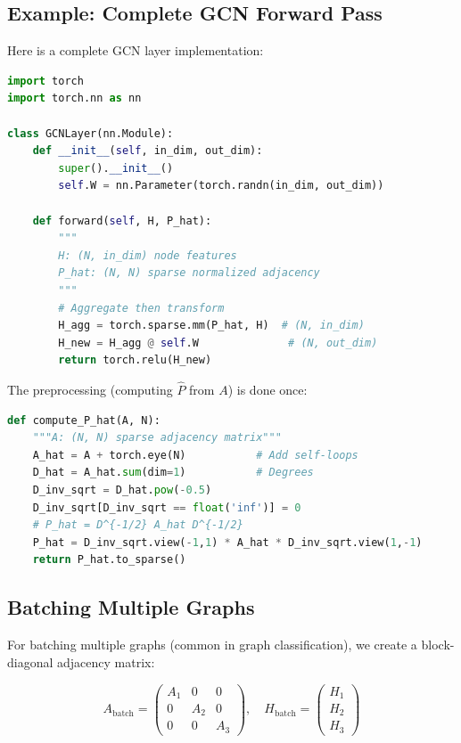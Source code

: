 \begin{notechapter}
\subsection{Example: Complete GCN Forward Pass}

\begin{example}
Here is a complete GCN layer implementation:

\begin{lstlisting}[style=pythonstyle, language=Python]
import torch
import torch.nn as nn

class GCNLayer(nn.Module):
    def __init__(self, in_dim, out_dim):
        super().__init__()
        self.W = nn.Parameter(torch.randn(in_dim, out_dim))
        
    def forward(self, H, P_hat):
        """
        H: (N, in_dim) node features
        P_hat: (N, N) sparse normalized adjacency
        """
        # Aggregate then transform
        H_agg = torch.sparse.mm(P_hat, H)  # (N, in_dim)
        H_new = H_agg @ self.W              # (N, out_dim)
        return torch.relu(H_new)
\end{lstlisting}

The preprocessing (computing $\hat{P}$ from $A$) is done once:
\begin{lstlisting}[style=pythonstyle, language=Python]
def compute_P_hat(A, N):
    """A: (N, N) sparse adjacency matrix"""
    A_hat = A + torch.eye(N)           # Add self-loops
    D_hat = A_hat.sum(dim=1)           # Degrees
    D_inv_sqrt = D_hat.pow(-0.5)
    D_inv_sqrt[D_inv_sqrt == float('inf')] = 0
    # P_hat = D^{-1/2} A_hat D^{-1/2}
    P_hat = D_inv_sqrt.view(-1,1) * A_hat * D_inv_sqrt.view(1,-1)
    return P_hat.to_sparse()
\end{lstlisting}
\end{example}

\subsection{Batching Multiple Graphs}

For batching multiple graphs (common in graph classification), we 
create a block-diagonal adjacency matrix:

\[
A_{\text{batch}} = \begin{pmatrix}
A_1 & 0 & 0 \\
0 & A_2 & 0 \\
0 & 0 & A_3
\end{pmatrix}, \quad
H_{\text{batch}} = \begin{pmatrix}
H_1 \\ H_2 \\ H_3
\end{pmatrix}
\]


\end{notechapter}
